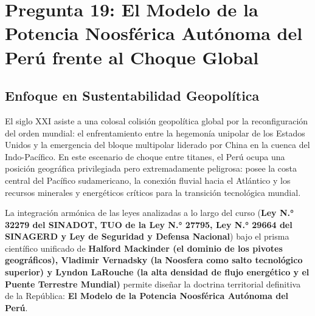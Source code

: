 \documentclass[11pt,a4paper]{article}
\begin{document}
\newpage

\section{Pregunta 19: El Modelo de la Potencia Noosférica Autónoma del Perú frente al Choque Global}

\subsection{Enfoque en Sustentabilidad Geopolítica}
El siglo XXI asiste a una colosal colisión geopolítica global por la reconfiguración del orden mundial: el enfrentamiento entre la hegemonía unipolar de los Estados Unidos y la emergencia del bloque multipolar liderado por China en la cuenca del Indo-Pacífico. En este escenario de choque entre titanes, el Perú ocupa una posición geográfica privilegiada pero extremadamente peligrosa: posee la costa central del Pacífico sudamericano, la conexión fluvial hacia el Atlántico y los recursos minerales y energéticos críticos para la transición tecnológica mundial.

La integración armónica de las leyes analizadas a lo largo del curso (\textbf{Ley N.° 32279 del SINADOT, TUO de la Ley N.° 27795, Ley N.° 29664 del SINAGERD y Ley de Seguridad y Defensa Nacional}) bajo el prisma científico unificado de \textbf{Halford Mackinder (el dominio de los pivotes geográficos), Vladimir Vernadsky (la Noosfera como salto tecnológico superior) y Lyndon LaRouche (la alta densidad de flujo energético y el Puente Terrestre Mundial)} permite diseñar la doctrina territorial definitiva de la República: \textbf{El Modelo de la Potencia Noosférica Autónoma del Perú}.
\end{document}

